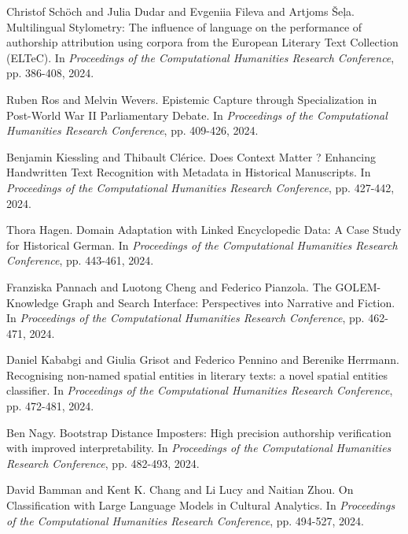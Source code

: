\begin{thebibliography}{99}
 Christof Sch{\"o}ch and Julia Dudar and Evgeniia Fileva and Artjoms {\v S}e{\c l}a. {M}ultilingual {S}tylometry: {T}he influence of language on the performance of authorship attribution using corpora from the {E}uropean {L}iterary {T}ext {C}ollection ({E}LTe{C}). In \textit{Proceedings of the Computational Humanities Research Conference}, pp. 386-408, 2024.

 Ruben Ros and Melvin Wevers. {E}pistemic {C}apture through {S}pecialization in {P}ost-{W}orld {W}ar {I}I {P}arliamentary {D}ebate. In \textit{Proceedings of the Computational Humanities Research Conference}, pp. 409-426, 2024.

 Benjamin Kiessling and Thibault Cl{\'e}rice. {D}oes {C}ontext {M}atter ? {E}nhancing {H}andwritten {T}ext {R}ecognition with {M}etadata in {H}istorical {M}anuscripts. In \textit{Proceedings of the Computational Humanities Research Conference}, pp. 427-442, 2024.

 Thora Hagen. {D}omain {A}daptation with {L}inked {E}ncyclopedic {D}ata: {A} Case {S}tudy for {H}istorical {G}erman. In \textit{Proceedings of the Computational Humanities Research Conference}, pp. 443-461, 2024.

 Franziska Pannach and Luotong Cheng and Federico Pianzola. {T}he {G}OL{E}M-{K}nowledge {G}raph and {S}earch {I}nterface: {P}erspectives into {N}arrative and {F}iction. In \textit{Proceedings of the Computational Humanities Research Conference}, pp. 462-471, 2024.

 Daniel Kababgi and Giulia Grisot and Federico Pennino and Berenike Herrmann. {R}ecognising non-named spatial entities in literary texts: a novel spatial entities classifier. In \textit{Proceedings of the Computational Humanities Research Conference}, pp. 472-481, 2024.

 Ben Nagy. {B}ootstrap {D}istance {I}mposters: {H}igh precision authorship verification with improved interpretability. In \textit{Proceedings of the Computational Humanities Research Conference}, pp. 482-493, 2024.

 David Bamman and Kent K. Chang and Li Lucy and Naitian Zhou. {O}n {C}lassification with {L}arge {L}anguage {M}odels in {C}ultural {A}nalytics. In \textit{Proceedings of the Computational Humanities Research Conference}, pp. 494-527, 2024.


\end{thebibliography}
